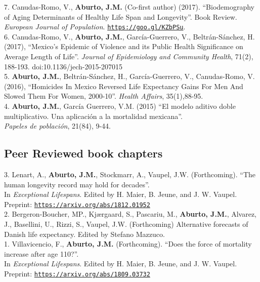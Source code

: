 \documentclass[12pt]{article}
\providecommand*\url[1]{\href{#1}{#1}}
\renewcommand*\url[1]{\href{#1}{\texttt{#1}}}
\begin{document}
7. Canudas-Romo, V.,  \textbf{Aburto, J.M.} (Co-first author) (2017). ``Biodemography of Aging Determinants of Healthy Life Span and Longevity''. Book Review.\\ \emph{European Journal of Population}. \url{https://goo.gl/KZbPSu}. \\ 

6. Canudas-Romo, V.,  \textbf{Aburto, J.M.}, Garc\'ia-Guerrero, V., Beltr\'an-S\'anchez, H. (2017),  ``Mexico's Epidemic of Violence and its Public Health Significance on Average Length of Life''. \emph{Journal of Epidemiology and Community Health}, 71(2), 188-193. doi:10.1136/jech-2015-207015 \\ 
	 
5. \textbf{Aburto, J.M.}, Beltr\'an-S\'anchez, H., Garc\'ia-Guerrero, V., Canudas-Romo, V. (2016), ``Homicides In Mexico Reversed Life Expectancy Gains For Men And Slowed Them For Women, 2000-10''. \emph{Health Affairs}, 35(1),88-95. \\ 
		     
4. \textbf{Aburto, J.M.}, Garc\'ia Guerrero, V.M. (2015) ``El modelo aditivo doble multiplicativo. Una aplicaci\'on a la mortalidad mexicana''.\\  \emph{Papeles de poblaci\'on}, 21(84), 9-44. \\
		  
\subsection*{Peer Reviewed book chapters}


3. Lenart, A., \textbf{Aburto, J.M.}, Stockmarr, A., Vaupel, J.W. (Forthcoming). ``The human longevity record may hold for decades''.\\ In \emph{Exceptional Lifespans}. Edited by H. Maier, B. Jeune, and J. W. Vaupel. \\ 
Preprint: \url{https://arxiv.org/abs/1812.01952}\\

2. Bergeron-Boucher, MP., Kj{\ae}rgaard, S.,  Pascariu, M., \textbf{Aburto, J.M.},  Alvarez, J., Basellini, U.,  Rizzi, S., Vaupel, J.W. (Forthcoming) Alternative forecasts of Danish life expectancy. Edited by Stefano Mazzuco.\\

1. Villavicencio, F., \textbf{Aburto, J.M.} (Forthcoming). ``Does the force of mortality increase after age 110?''.\\ In \emph{Exceptional Lifespans}. Edited by H. Maier, B. Jeune, and J. W. Vaupel. \\
Preprint: \url{https://arxiv.org/abs/1809.03732}\\
		  		  
\end{document}
